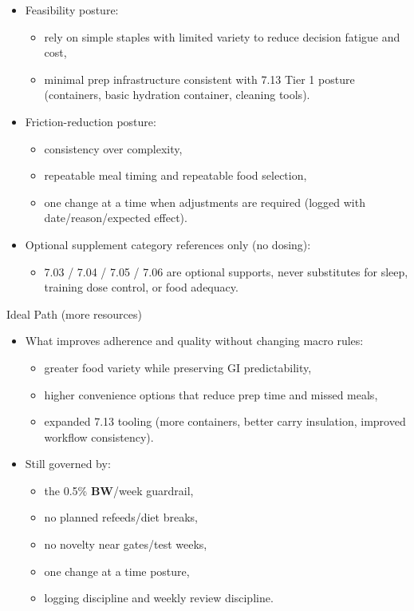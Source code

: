 \documentclass[10pt]{article}
\begin{document}
\begin{itemize}
\item Feasibility posture:
  \begin{itemize}
  \item rely on simple staples with limited variety to reduce decision fatigue and cost,
  \item minimal prep infrastructure consistent with 7.13 Tier 1 posture (containers, basic hydration container, cleaning tools).
  \end{itemize}
\item Friction-reduction posture:
  \begin{itemize}
  \item consistency over complexity,
  \item repeatable meal timing and repeatable food selection,
  \item one change at a time when adjustments are required (logged with date/reason/expected effect).
  \end{itemize}
\item Optional supplement category references only (no dosing):
  \begin{itemize}
  \item 7.03 / 7.04 / 7.05 / 7.06 are optional supports, never substitutes for sleep, training dose control, or food adequacy.
  \end{itemize}
\end{itemize}

Ideal Path (more resources)

\begin{itemize}
\item What improves adherence and quality without changing macro rules:
  \begin{itemize}
  \item greater food variety while preserving GI predictability,
  \item higher convenience options that reduce prep time and missed meals,
  \item expanded 7.13 tooling (more containers, better carry insulation, improved workflow consistency).
  \end{itemize}
\item Still governed by:
  \begin{itemize}
  \item the 0.5\% \textbf{BW}/week guardrail,
  \item no planned refeeds/diet breaks,
  \item no novelty near gates/test weeks,
  \item one change at a time posture,
  \item logging discipline and weekly review discipline.
  \end{itemize}
\end{itemize}
\end{document}
